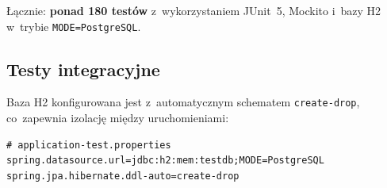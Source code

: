 Łącznie: \textbf{ponad 180 testów} z~wykorzystaniem JUnit~5, Mockito i~bazy H2 w~trybie \texttt{MODE=PostgreSQL}.

\subsection{Testy integracyjne}

Baza H2 konfigurowana jest z~automatycznym schematem \texttt{create-drop}, co~zapewnia izolację między uruchomieniami:

\begin{verbatim}
# application-test.properties
spring.datasource.url=jdbc:h2:mem:testdb;MODE=PostgreSQL
spring.jpa.hibernate.ddl-auto=create-drop
\end{verbatim}

